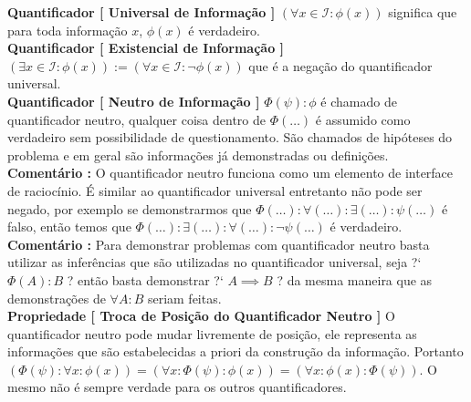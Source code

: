 \documentclass[10pt,a4paper]{report}
\begin{document}
\hspace{\baselineskip}

\textbf{Quantificador [ Universal de Informação ]} $ (\forall x \in \mathcal{I} : \phi(x)) $ significa que para toda informação $x$, $\phi(x)$ é verdadeiro.\\

\textbf{Quantificador [ Existencial de Informação ]} $ (\exists x \in \mathcal{I} : \phi(x) ) := (\forall x \in \mathcal{I}  : \neg \phi(x) )$ que é a negação do quantificador universal.\\

\textbf{Quantificador [ Neutro de Informação ]} $ \Phi( \psi ) : \phi $ é chamado de quantificador neutro, qualquer coisa dentro de $\Phi(\dots)$ é assumido como verdadeiro sem possibilidade de questionamento. São chamados de hipóteses do problema e em geral são informações já demonstradas ou definições.\\

\textbf{Comentário :} O quantificador neutro funciona como um elemento de interface de raciocínio. É similar ao quantificador universal entretanto não pode ser negado, por exemplo se demonstrarmos que $ \Phi( \dots ) : \forall(\dots) : \exists(\dots) : \psi(\dots) $ é falso, então temos que $ \Phi(\dots) : \exists(\dots) : \forall(\dots) : \neg \psi(\dots) $ é verdadeiro.\\

\textbf{Comentário :} Para demonstrar problemas com quantificador neutro basta utilizar as inferências que são utilizadas no quantificador universal, seja  ?` $ \Phi(A) : B $ ? então basta demonstrar ?` $ A \implies B$  ? da mesma maneira que as demonstrações de $\forall A : B$ seriam feitas.\\

\textbf{Propriedade [ Troca de Posição do Quantificador Neutro ]} O quantificador neutro pode mudar livremente de posição, ele representa as informações que são estabelecidas a priori da construção da informação. Portanto $( \Phi (\psi) : \forall x : \phi(x) )=( \forall x : \Phi(\psi) : \phi(x) )=( \forall x : \phi(x) : \Phi(\psi) )$. O mesmo não é sempre verdade para os outros quantificadores.

\hspace{\baselineskip}
\end{document}
